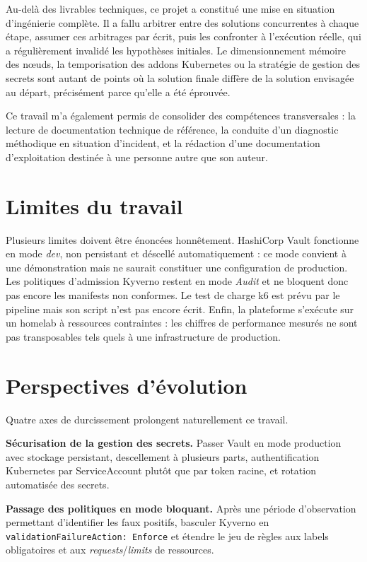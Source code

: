 \documentclass[12pt,a4paper,twoside,openright]{report}
\begin{document}
Au-delà des livrables techniques, ce projet a constitué une mise en situation
d'ingénierie complète. Il a fallu arbitrer entre des solutions concurrentes à chaque
étape, assumer ces arbitrages par écrit, puis les confronter à l'exécution réelle,
qui a régulièrement invalidé les hypothèses initiales. Le dimensionnement mémoire des
n\oe uds, la temporisation des addons Kubernetes ou la stratégie de gestion des
secrets sont autant de points où la solution finale diffère de la solution envisagée
au départ, précisément parce qu'elle a été éprouvée.

Ce travail m'a également permis de consolider des compétences transversales : la
lecture de documentation technique de référence, la conduite d'un diagnostic
méthodique en situation d'incident, et la rédaction d'une documentation d'exploitation
destinée à une personne autre que son auteur.

\section*{Limites du travail}

Plusieurs limites doivent être énoncées honnêtement. HashiCorp Vault fonctionne en
mode \emph{dev}, non persistant et déscellé automatiquement : ce mode convient à une
démonstration mais ne saurait constituer une configuration de production. Les
politiques d'admission Kyverno restent en mode \emph{Audit} et ne bloquent donc pas
encore les manifests non conformes. Le test de charge k6 est prévu par le pipeline
mais son script n'est pas encore écrit. Enfin, la plateforme s'exécute sur un homelab
à ressources contraintes : les chiffres de performance mesurés ne sont pas
transposables tels quels à une infrastructure de production.

\section*{Perspectives d'évolution}

Quatre axes de durcissement prolongent naturellement ce travail.

\textbf{Sécurisation de la gestion des secrets.} Passer Vault en mode production avec
stockage persistant, descellement à plusieurs parts, authentification Kubernetes par
ServiceAccount plutôt que par token racine, et rotation automatisée des secrets.

\textbf{Passage des politiques en mode bloquant.} Après une période d'observation
permettant d'identifier les faux positifs, basculer Kyverno en
\texttt{validationFailureAction: Enforce} et étendre le jeu de règles aux labels
obligatoires et aux \emph{requests}/\emph{limits} de ressources.
\end{document}
